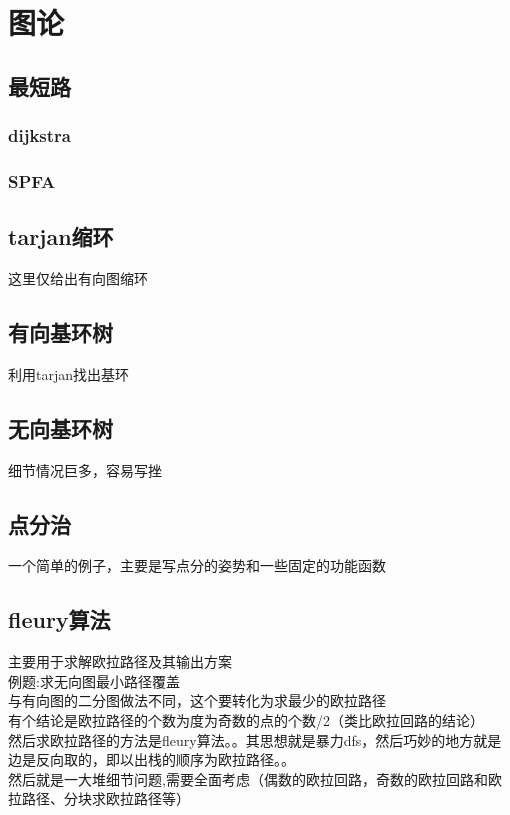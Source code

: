 %
%
	\newpage
	\section{图论}
	\subsection{最短路}
	\subsubsection*{dijkstra}
	
	\vspace{2cm}
	\subsubsection*{SPFA}
	
	\newpage
	\subsection{tarjan缩环}
	{\large 这里仅给出有向图缩环}\\
	
	\newpage
	\subsection{有向基环树}
	{\large 利用tarjan找出基环}\\
	
	\newpage
	\subsection{无向基环树}
	{\large 细节情况巨多，容易写挫}\\
	
	\newpage
	\subsection{点分治}
	{\large 一个简单的例子，主要是写点分的姿势和一些固定的功能函数}\\
	
	\newpage
	\subsection{fleury算法}
	主要用于求解欧拉路径及其输出方案\vspace{0.3cm}\\
	{\small 例题:求无向图最小路径覆盖\\	
	与有向图的二分图做法不同，这个要转化为求最少的欧拉路径\\
	有个结论是欧拉路径的个数为度为奇数的点的个数/2（类比欧拉回路的结论）\\	
	然后求欧拉路径的方法是fleury算法。。其思想就是暴力dfs，然后巧妙的地方就是边是反向取的，即以出栈的顺序为欧拉路径。。\\
	然后就是一大堆细节问题,需要全面考虑（偶数的欧拉回路，奇数的欧拉回路和欧拉路径、分块求欧拉路径等）\\}
	
	\newpage

